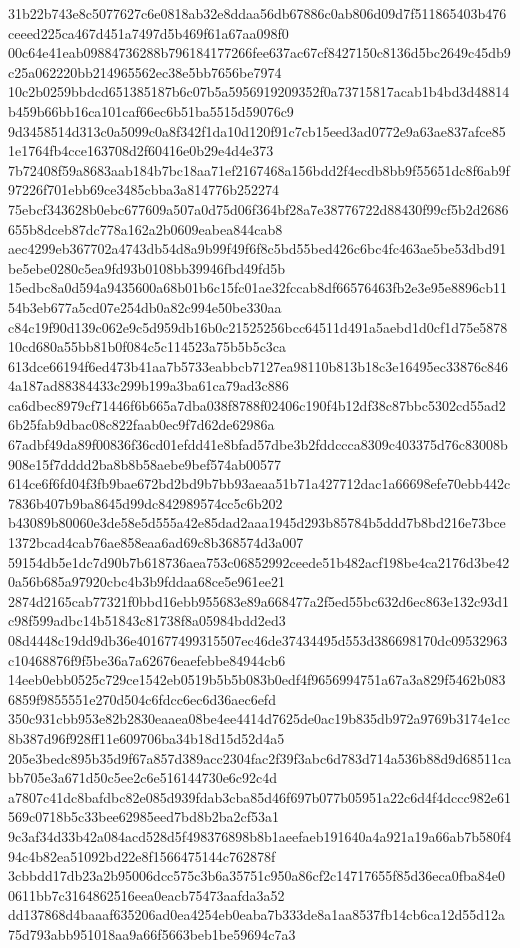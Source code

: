 \documentclass[11pt,a4paper]{article}
\begin{document}
{31b22b743e8c5077627c6e0818ab32e8ddaa56db67886c0ab806d09d7f511865403b476ceeed225ca467d451a7497d5b469f61a67aa098f0
00c64e41eab09884736288b796184177266fee637ac67cf8427150c8136d5bc2649c45db9c25a062220bb214965562ec38e5bb7656be7974
10c2b0259bbdcd651385187b6c07b5a5956919209352f0a73715817acab1b4bd3d48814b459b66bb16ca101caf66ec6b51ba5515d59076c9
9d3458514d313c0a5099c0a8f342f1da10d120f91c7cb15eed3ad0772e9a63ae837afce851e1764fb4cce163708d2f60416e0b29e4d4e373
7b72408f59a8683aab184b7bc18aa71ef2167468a156bdd2f4ecdb8bb9f55651dc8f6ab9f97226f701ebb69ce3485cbba3a814776b252274
75ebcf343628b0ebc677609a507a0d75d06f364bf28a7e38776722d88430f99cf5b2d2686655b8dceb87dc778a162a2b0609eabea844cab8
aec4299eb367702a4743db54d8a9b99f49f6f8c5bd55bed426c6bc4fc463ae5be53dbd91be5ebe0280c5ea9fd93b0108bb39946fbd49fd5b
15edbc8a0d594a9435600a68b01b6c15fc01ae32fccab8df66576463fb2e3e95e8896cb1154b3eb677a5cd07e254db0a82c994e50be330aa
c84c19f90d139c062e9c5d959db16b0c21525256bcc64511d491a5aebd1d0cf1d75e587810cd680a55bb81b0f084c5c114523a75b5b5c3ca
613dce66194f6ed473b41aa7b5733eabbcb7127ea98110b813b18c3e16495ec33876c8464a187ad88384433c299b199a3ba61ca79ad3c886
ca6dbec8979cf71446f6b665a7dba038f8788f02406c190f4b12df38c87bbc5302cd55ad26b25fab9dbac08c822faab0ec9f7d62de62986a
67adbf49da89f00836f36cd01efdd41e8bfad57dbe3b2fddccca8309c403375d76c83008b908e15f7dddd2ba8b8b58aebe9bef574ab00577
614ce6f6fd04f3fb9bae672bd2bd9b7bb93aeaa51b71a427712dac1a66698efe70ebb442c7836b407b9ba8645d99dc842989574cc5c6b202
b43089b80060e3de58e5d555a42e85dad2aaa1945d293b85784b5ddd7b8bd216e73bce1372bcad4cab76ae858eaa6ad69c8b368574d3a007
59154db5e1dc7d90b7b618736aea753c06852992ceede51b482acf198be4ca2176d3be420a56b685a97920cbc4b3b9fddaa68ce5e961ee21
2874d2165cab77321f0bbd16ebb955683e89a668477a2f5ed55bc632d6ec863e132c93d1c98f599adbc14b51843c81738f8a05984bdd2ed3
08d4448c19dd9db36e401677499315507ec46de37434495d553d386698170dc09532963c10468876f9f5be36a7a62676eaefebbe84944cb6
14eeb0ebb0525c729ce1542eb0519b5b5b083b0edf4f9656994751a67a3a829f5462b0836859f9855551e270d504c6fdcc6ec6d36aec6efd
350c931cbb953e82b2830eaaea08be4ee4414d7625de0ac19b835db972a9769b3174e1cc8b387d96f928ff11e609706ba34b18d15d52d4a5
205e3bedc895b35d9f67a857d389acc2304fac2f39f3abc6d783d714a536b88d9d68511cabb705e3a671d50c5ee2c6e516144730e6c92c4d
a7807c41dc8bafdbc82e085d939fdab3cba85d46f697b077b05951a22c6d4f4dccc982e61569c0718b5c33bee62985eed7bd8b2ba2cf53a1
9c3af34d33b42a084acd528d5f498376898b8b1aeefaeb191640a4a921a19a66ab7b580f494c4b82ea51092bd22e8f1566475144c762878f
3cbbdd17db23a2b95006dcc575c3b6a35751c950a86cf2c14717655f85d36eca0fba84e00611bb7c3164862516eea0eacb75473aafda3a52
dd137868d4baaaf635206ad0ea4254eb0eaba7b333de8a1aa8537fb14cb6ca12d55d12a75d793abb951018aa9a66f5663beb1be59694c7a3
}
\end{document}
